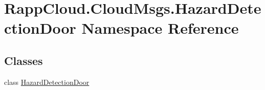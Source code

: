 \hypertarget{namespaceRappCloud_1_1CloudMsgs_1_1HazardDetectionDoor}{\section{Rapp\-Cloud.\-Cloud\-Msgs.\-Hazard\-Detection\-Door Namespace Reference}
\label{namespaceRappCloud_1_1CloudMsgs_1_1HazardDetectionDoor}
}
\subsection*{Classes}
\begin{DoxyCompactItemize}
\item 
class \hyperlink{classRappCloud_1_1CloudMsgs_1_1HazardDetectionDoor_1_1HazardDetectionDoor}{Hazard\-Detection\-Door}
\end{DoxyCompactItemize}

